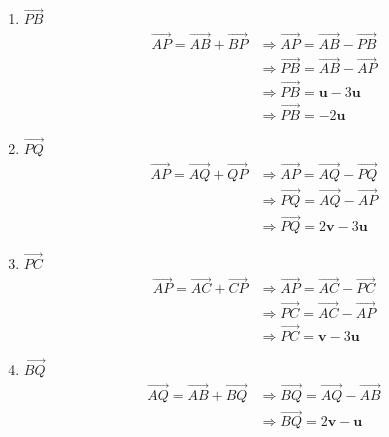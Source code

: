 \documentclass[twoside]{article}\usepackage[]{graphicx}\usepackage[]{xcolor}
\begin{document}
\begin{enumerate}
\begin{enumerate}[label=(\alph*)]
        \item $\overrightarrow{PB}$
        \begin{align*}
            \overrightarrow{AP} = \overrightarrow{AB} + \overrightarrow{BP} &\Rightarrow \overrightarrow{AP} = \overrightarrow{AB} - \overrightarrow{PB}\\
            &\Rightarrow \overrightarrow{PB} = \overrightarrow{AB} - \overrightarrow{AP}\\
            &\Rightarrow \overrightarrow{PB} = \mathbf{u} - 3\mathbf{u}\\
            &\Rightarrow \overrightarrow{PB} = -2 \mathbf{u}
        \end{align*}
        
        \item $\overrightarrow{PQ}$
        \begin{align*}
            \overrightarrow{AP} = \overrightarrow{AQ} + \overrightarrow{QP} & \Rightarrow \overrightarrow{AP} = \overrightarrow{AQ} - \overrightarrow{PQ}\\
            &\Rightarrow \overrightarrow{PQ} = \overrightarrow{AQ} - \overrightarrow{AP}\\
            &\Rightarrow \overrightarrow{PQ} = 2\mathbf{v} - 3\mathbf{u}
        \end{align*}
        
        \item $\overrightarrow{PC}$
        \begin{align*}
            \overrightarrow{AP} = \overrightarrow{AC} + \overrightarrow{CP} &\Rightarrow \overrightarrow{AP} = \overrightarrow{AC} - \overrightarrow{PC}\\
            &\Rightarrow \overrightarrow{PC} = \overrightarrow{AC} - \overrightarrow{AP}\\
            &\Rightarrow \overrightarrow{PC} = \mathbf{v} - 3 \mathbf{u}
        \end{align*}
        
        \item $\overrightarrow{BQ}$
        \begin{align*}
            \overrightarrow{AQ} = \overrightarrow{AB} + \overrightarrow{BQ} &\Rightarrow \overrightarrow{BQ} = \overrightarrow{AQ} - \overrightarrow{AB}\\
            &\Rightarrow \overrightarrow{BQ} = 2 \mathbf{v} - \mathbf{u}
        \end{align*}
        

\end{enumerate}
\end{enumerate}
\end{document}
